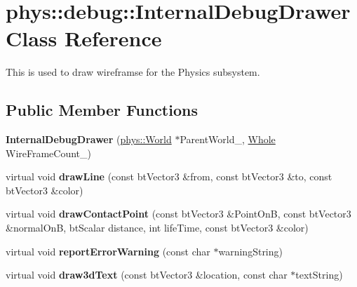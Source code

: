 \hypertarget{classphys_1_1debug_1_1InternalDebugDrawer}{
\section{phys::debug::InternalDebugDrawer Class Reference}
\label{db/d27/classphys_1_1debug_1_1InternalDebugDrawer}
}


This is used to draw wireframse for the Physics subsystem.  


\subsection*{Public Member Functions}
\begin{DoxyCompactItemize}
\item 
\hypertarget{classphys_1_1debug_1_1InternalDebugDrawer_a2bdb7e9da99e2d0cd2796cf9c67c3456}{
{\bfseries InternalDebugDrawer} (\hyperlink{classphys_1_1World}{phys::World} $\ast$ParentWorld\_\-, \hyperlink{namespacephys_a460f6bc24c8dd347b05e0366ae34f34a}{Whole} WireFrameCount\_)}
\label{db/d27/classphys_1_1debug_1_1InternalDebugDrawer_a2bdb7e9da99e2d0cd2796cf9c67c3456}

\item 
\hypertarget{classphys_1_1debug_1_1InternalDebugDrawer_a8a35c3c80fddaaec8e21f737ed1b3938}{
virtual void {\bfseries drawLine} (const btVector3 \&from, const btVector3 \&to, const btVector3 \&color)}
\label{db/d27/classphys_1_1debug_1_1InternalDebugDrawer_a8a35c3c80fddaaec8e21f737ed1b3938}

\item 
\hypertarget{classphys_1_1debug_1_1InternalDebugDrawer_a8b912aaff8dfd9f4e97ffb2d867121b2}{
virtual void {\bfseries drawContactPoint} (const btVector3 \&PointOnB, const btVector3 \&normalOnB, btScalar distance, int lifeTime, const btVector3 \&color)}
\label{db/d27/classphys_1_1debug_1_1InternalDebugDrawer_a8b912aaff8dfd9f4e97ffb2d867121b2}

\item 
\hypertarget{classphys_1_1debug_1_1InternalDebugDrawer_a4e3b4cbc861f76696b4d32f0cf068ea6}{
virtual void {\bfseries reportErrorWarning} (const char $\ast$warningString)}
\label{db/d27/classphys_1_1debug_1_1InternalDebugDrawer_a4e3b4cbc861f76696b4d32f0cf068ea6}

\item 
\hypertarget{classphys_1_1debug_1_1InternalDebugDrawer_a1266d3fad8868ade2d515e9c92e76b4a}{
virtual void {\bfseries draw3dText} (const btVector3 \&location, const char $\ast$textString)}
\label{db/d27/classphys_1_1debug_1_1InternalDebugDrawer_a1266d3fad8868ade2d515e9c92e76b4a}


\end{DoxyCompactItemize}
